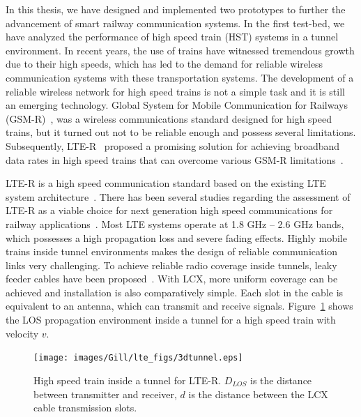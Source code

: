 In this thesis, we have designed and implemented two prototypes to further the advancement of smart railway communication systems. In the first test-bed, we have analyzed the performance of high speed train (HST) systems in a tunnel environment. In recent years, the use of trains have witnessed tremendous growth due to their high speeds, which has led to the demand for reliable wireless communication systems with these transportation systems. The development of a reliable wireless network for high speed trains is not a simple task and it is still an emerging technology. Global System for Mobile Communication for Railways (GSM-R)~\cite{trlter1}, was a wireless communications standard designed for high speed trains, but it turned out not to be reliable enough and possess several limitations. Subsequently, LTE-R~\cite{trlter2} proposed a promising solution for achieving broadband data rates in high speed trains that can overcome various GSM-R limitations~\cite{arlter3,inplter4}. 

LTE-R is a high speed communication standard based on the existing LTE system architecture~\cite{inplter4}. There has been several studies regarding the assessment of LTE-R as a viable choice for next generation high speed communications for railway applications~\cite{inplter5,inplter6}. Most LTE systems operate at 1.8 GHz -- 2.6 GHz bands, which possesses a high propagation loss and severe fading effects. Highly mobile trains inside tunnel environments makes the design of reliable communication links very challenging. To achieve reliable radio coverage inside tunnels, leaky feeder cables have been proposed~\cite{arlter7}. With LCX, more uniform coverage can be achieved and installation is also comparatively simple. Each slot in the cable is equivalent to an antenna, which can transmit and receive signals. Figure~\ref{fig:ltertunnel} shows the LOS propagation environment inside a tunnel for a high speed train with velocity $v$.
  
\begin{figure}[!ht]
\centering
\texttt{[image: images/Gill/lte\_figs/3dtunnel.eps]} 
\caption{High speed train inside a tunnel for LTE-R. $D_{LOS}$ is the distance between transmitter and receiver, $d$ is the distance between the LCX cable transmission slots.}
\label{fig:ltertunnel}
\end{figure}

